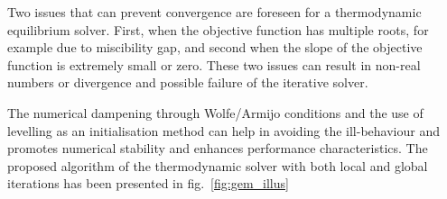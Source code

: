 	Two issues that can prevent convergence are foreseen for a thermodynamic equilibrium solver. First, when the objective function has multiple roots, for example due to miscibility gap, and second when the slope of the objective function is extremely small or zero. These two issues can result in non-real numbers or divergence and possible failure of the iterative solver.

	The numerical dampening through Wolfe/Armijo conditions and the use of levelling as an initialisation method can help in avoiding the ill-behaviour and promotes numerical stability and enhances performance characteristics. The proposed algorithm of the thermodynamic solver with both local and global iterations has been presented in fig.~\ref{fig:gem_illus}

\begin{landscape}
\thispagestyle{empty}


\end{landscape}
